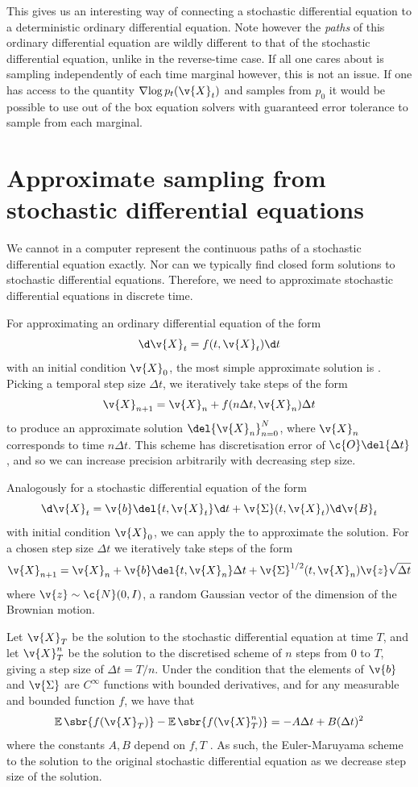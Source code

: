 This gives us an interesting way of connecting a stochastic differential equation to a deterministic ordinary differential equation.
Note however the \emph{paths} of this ordinary differential equation are wildly different to that of the stochastic differential equation, unlike in the reverse-time case.
If all one cares about is sampling independently of each time marginal however, this is not an issue.
If one has access to the quantity \(\nabla {\log p_t(\v{X}_t)}\) and samples from \(p_0\) it would be possible to use out of the box equation solvers with guaranteed error tolerance to sample from each marginal.

\section{Approximate sampling from stochastic differential equations}
\label{sec:approximate_sde_sampling}

We cannot in a computer represent the continuous paths of a stochastic differential equation exactly.
Nor can we typically find closed form solutions to stochastic differential equations.
Therefore, we need to approximate stochastic differential equations in discrete time.

For approximating an ordinary differential equation of the form
\[\d\v{X}_t = f(t, \v{X}_t) \d t\]
with an initial condition \(\v{X}_0\), the most simple approximate solution is .
Picking a temporal step size \(\Delta t\), we iteratively take steps of the form
\[\v{X}_{n+1} =  \v{X}_n + f(n\Delta t, \v{X}_n) \Delta t\]
to produce an approximate solution \(\del{\v{X}_n}_{n=0}^N\), where \(\v{X}_n\) corresponds to time \(n\Delta t\).
This scheme has discretisation error of \(\c{O}\del{\Delta t}\), and so we can increase precision arbitrarily with decreasing step size.

Analogously for a stochastic differential equation of the form
\[\d\v{X}_t = \v{b}\del{t, \v{X}_t} \d t + \v{\Sigma}(t, \v{X}_t) \d\v{B}_t\]
with initial condition \(\v{X}_0\), we can apply the  to approximate the solution.
For a chosen step size \(\Delta t\) we iteratively take steps of the form 
\[\v{X}_{n+1} = \v{X}_n + \v{b}\del{t, \v{X}_n} \Delta t + \v{\Sigma}^{1/2}(t, \v{X}_n) \v{z} \sqrt{\Delta t} \]
where \(\v{z} \sim \c{N}(0, I)\), a random Gaussian vector of the dimension of the Brownian motion.

Let \(\v{X}_T\) be the solution to the stochastic differential equation at time \(T\), and let \(\v{X}_T^n\) be the solution to the discretised scheme of \(n\) steps from \(0\) to \(T\), giving a step size of \(\Delta t = T/n\).
Under the condition that the elements of \(\v{b}\) and \(\v{\Sigma}\) are \(C^\infty\) functions with bounded derivatives, and for any measurable and bounded function \(f\), we have that
\[
	\E\sbr{f(\v{X}_T)} - \E \sbr{f(\v{X}_T^n)} = -A \Delta t + B (\Delta t)^2
\]
where the constants \(A, B\) depend on \(f, T\) \parencite[Theorem 3.1]{bally1996law}.
As such, the Euler-Maruyama scheme  to the solution to the original stochastic differential equation as we decrease step size of the solution.
